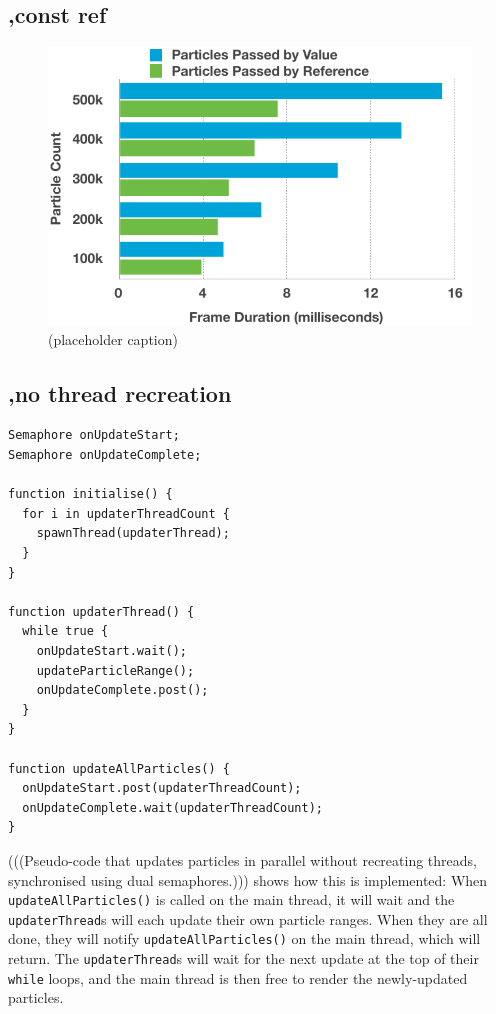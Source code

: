 \documentclass[11pt, a4paper, twocolumn]{article}
\begin{document}
\subsection{,const ref}

\lipsum[1-1]

\begin{figure}[h]
\includegraphics[width=\linewidth]{pass-by-value-reference}
\caption{(placeholder caption)}
\label{fig:pass-by-value-reference}
\end{figure}

\subsection{,no thread recreation}

\lipsum[1-1]

\begin{verbatim}
Semaphore onUpdateStart;
Semaphore onUpdateComplete;

function initialise() {
  for i in updaterThreadCount {
    spawnThread(updaterThread);
  }
}

function updaterThread() {
  while true {
    onUpdateStart.wait();
    updateParticleRange();
    onUpdateComplete.post();
  }
}

function updateAllParticles() {
  onUpdateStart.post(updaterThreadCount);
  onUpdateComplete.wait(updaterThreadCount);
}
\end{verbatim}

(((Pseudo-code that updates particles in parallel without recreating threads, synchronised using dual semaphores.))) shows how this is implemented: When \verb|updateAllParticles()| is called on the main thread, it will wait and the \verb|updaterThread|s will each update their own particle ranges. When they are all done, they will notify \verb|updateAllParticles()| on the main thread, which will return. The \verb|updaterThread|s will wait for the next update at the top of their \verb|while| loops, and the main thread is then free to render the newly-updated particles.
\end{document}
